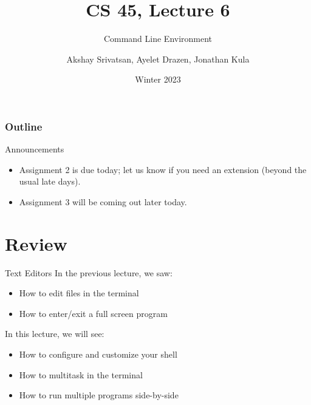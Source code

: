 \usepackage{shared/cs45}

\title{CS 45, Lecture 6}
\subtitle{Command Line Environment}
\date{Winter 2023}
\author{Akshay Srivatsan, Ayelet Drazen, Jonathan Kula}

\newcommand{\var}[1]{\texttt{\$#1}}
\newcommand{\cmd}[1]{\texttt{#1}}



\maketitle

\frame{\titlepage}

\begin{frame}
  \frametitle{Outline}
  \tableofcontents[hidesubsections]
\end{frame}

\begin{frame}{Announcements}
  \begin{itemize}
    \item Assignment 2 is due today; let us know if you need an extension
      (beyond the usual late days).
    \item Assignment 3 will be coming out later today.
  \end{itemize}
\end{frame}


\section{Review}

\begin{frame}{Text Editors}
  In the previous lecture, we saw:
  \begin{itemize}
    \item
      How to edit files in the terminal
      \pause
    \item
      How to enter/exit a full screen program
      \pause
  \end{itemize}
  In this lecture, we will see:
  \begin{itemize}
    \item
      How to configure and customize your shell
      \pause
    \item
      How to multitask in the terminal
      \pause
    \item
      How to run multiple programs side-by-side
  \end{itemize}
\end{frame}


